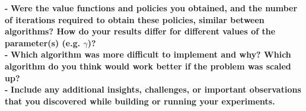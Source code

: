 \documentclass[11pt]{article}
\begin{document}
\noindent
\textbf{-}
\noindent
\textbf{Were the value functions and policies you obtained, and the number of
iterations required to obtain these policies, similar between algorithms? How do
your results differ for different values of the parameter(s) (e.g. $\gamma$)?}
\\

\noindent
\textbf{-}
\noindent
\textbf{Which algorithm was more difficult to implement and why? Which algorithm
do you think would work better if the problem was scaled up?}
\\

\noindent
\textbf{-}
\noindent
\textbf{Include any additional insights, challenges, 
or important observations that you discovered while building or
 running your experiments.}
\\
\end{document}
